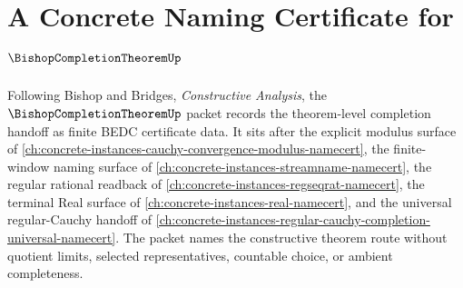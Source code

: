 \chapter{A Concrete Naming Certificate for $\BishopCompletionTheoremUp$}
\label{ch:concrete-instances-bishop-completion-theorem-namecert}

Following Bishop and Bridges, \emph{Constructive Analysis}, the $\BishopCompletionTheoremUp$ packet records the theorem-level completion handoff as finite BEDC certificate data. It sits after the explicit modulus surface of \autoref{ch:concrete-instances-cauchy-convergence-modulus-namecert}, the finite-window naming surface of \autoref{ch:concrete-instances-streamname-namecert}, the regular rational readback of \autoref{ch:concrete-instances-regseqrat-namecert}, the terminal Real surface of \autoref{ch:concrete-instances-real-namecert}, and the universal regular-Cauchy handoff of \autoref{ch:concrete-instances-regular-cauchy-completion-universal-namecert}. The packet names the constructive theorem route without quotient limits, selected representatives, countable choice, or ambient completeness.

